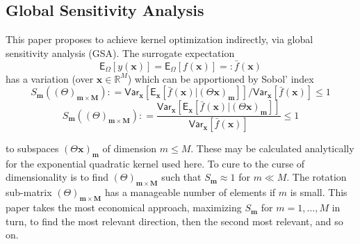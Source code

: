 \documentclass[preprint,12pt]{elsarticle}
\newcommand*{\M}[1]{\ensuremath{#1}\xspace}
\newcommand*{\vr}[1]{\M{\mathbf{#1}}}
\newcommand*{\st}[1]{\M{\mathbb{#1}}}
\newcommand*{\deq}{\M{\mathrel{\mathop:}=}}
\newcommand*{\deqr}{\M{=\mathrel{\mathop:}}}
\newcommand*{\ev}[2][]{\mathsf{E}_{#1}\!\left\lbrack{} #2 \right\rbrack}
\newcommand*{\var}[2][]{\mathsf{Var}_{#1}\!\left\lbrack{} #2 \right\rbrack}
\begin{document}
        \subsection{Global Sensitivity Analysis}
            This paper proposes to achieve kernel optimization indirectly, via global sensitivity analysis (GSA).
            The surrogate expectation
            \begin{equation*}
                \ev[\Omega]{y(\vr{x})} = \ev[\Omega]{f(\vr{x})} \deqr \bar{f}(\vr{x})
            \end{equation*}
            has a variation (over $\vr{x} \in \st{R}^{M}$) which can be apportioned by Sobol' index
            \begin{equation*}
                S_{\vr{m}}((\Theta)_{\vr{m}\times\vr{M}}) \deq \var[\vr{x}]{\ev[\vr{x}]{\bar{f}(\vr{x}) \vert (\Theta \vr{x})_{\vr{m}}}} / \var[\vr{x}]{\bar{f}(\vr{x})} \leq 1
            \end{equation*}
            \begin{equation*}
            S_{\vr{m}}((\Theta)_{\vr{m}\times\vr{M}}) \deq \frac{\var[\vr{x}]{\ev[\vr{x}]{\bar{f}(\vr{x}) \vert (\Theta \vr{x})_{\vr{m}}}}}{\var[\vr{x}]{\bar{f}(\vr{x})}} \leq 1
            \end{equation*}
            
            to subspaces $(\Theta \vr{x})_{\vr{m}}$ of dimension $m\leq M$. These may be calculated analytically for the exponential quadratic kernel used here. To cure to the curse of dimensionality is to find $(\Theta)_{\vr{m}\times\vr{M}}$ such that $S_{\vr{m}} \approx 1$ for $m\ll M$. The rotation sub-matrix $(\Theta)_{\vr{m}\times\vr{M}}$ has a manageable number of elements if $m$ is small. This paper takes the most economical approach, maximizing $S_{\vr{m}}$ for $m=1,\ldots,M$ in turn, to find the most relevant direction, then the second most relevant, and so on. 
\end{document}

